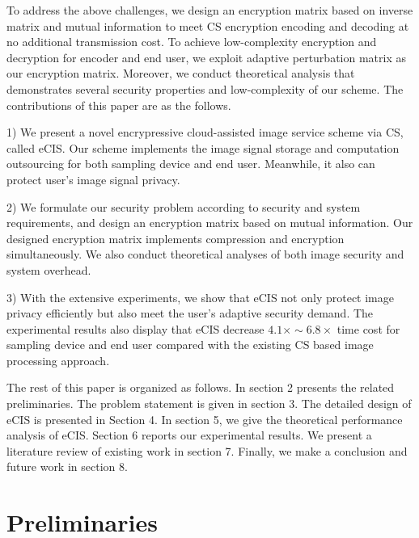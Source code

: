 \documentclass[conference]{IEEEtran}
\begin{document}
To address the above challenges, we design an encryption matrix based on inverse matrix and mutual information to meet CS encryption encoding and decoding at no additional transmission cost. To achieve low-complexity encryption and decryption for encoder and end user, we exploit adaptive perturbation matrix as our encryption matrix. Moreover, we conduct theoretical analysis that demonstrates several   security properties and low-complexity of our scheme.
The contributions of this paper are as the follows.

1) We present a novel encrypressive cloud-assisted image service scheme  via CS, called eCIS. Our scheme implements the image signal storage and computation outsourcing for both sampling device and end user. Meanwhile, it also can protect user's image signal privacy.

2) We formulate our security problem according to security and system requirements, and design an encryption matrix based on mutual information. Our designed encryption matrix implements compression and encryption simultaneously. We also conduct theoretical analyses of both image security and system overhead.


3) With the extensive experiments, we show that  eCIS not only protect image privacy efficiently but also meet the user's adaptive security demand. The experimental results also display that  eCIS decrease $4.1\times\sim6.8\times$ time cost for sampling device and end user compared with the existing CS based image processing approach.


The rest of this paper is organized as follows.  In section 2 presents the related preliminaries. The problem statement is given in section 3. The detailed design of eCIS is presented in Section 4. In section 5, we give the theoretical performance analysis of eCIS. Section 6 reports our experimental results. We present a literature review of existing work in section 7. Finally, we make a conclusion and future work in section 8.


\section{Preliminaries}
\end{document}
